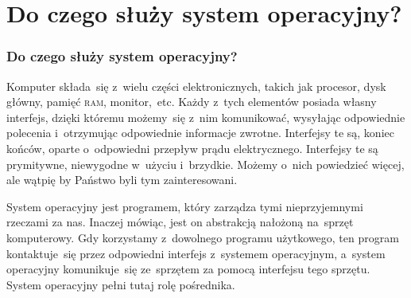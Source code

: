\documentclass[10pt,t]{beamer}
\begin{document}
\section{Do czego służy system operacyjny?}


\begin{frame}
  \frametitle{Do czego służy system operacyjny?}


  Komputer składa~się z~wielu części elektronicznych, takich jak procesor,
  dysk główny, pamięć \textsc{ram}, monitor,~etc. Każdy z~tych elementów
  posiada własny interfejs, dzięki któremu możemy~się z~nim komunikować,
  wysyłając odpowiednie polecenia i~otrzymując odpowiednie informacje
  zwrotne. Interfejsy te są, koniec końców, oparte o~odpowiedni przepływ
  prądu elektrycznego. Interfejsy te są prymitywne, niewygodne w~użyciu
  i~brzydkie. Możemy o~nich powiedzieć więcej, ale wątpię by Państwo byli
  tym zainteresowani.

  System operacyjny jest programem, który zarządza tymi nieprzyjemnymi
  rzeczami za nas. Inaczej mówiąc, jest on abstrakcją nałożoną na~sprzęt
  komputerowy. Gdy korzystamy z~dowolnego programu użytkowego, ten program
  kontaktuje~się przez odpowiedni interfejs z~systemem operacyjnym,
  a~system operacyjny komunikuje~się ze~sprzętem za pomocą interfejsu tego
  sprzętu. System operacyjny pełni tutaj rolę pośrednika.





\end{frame}
\end{document}
